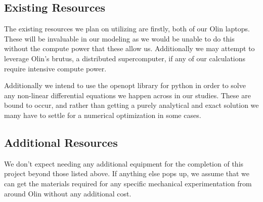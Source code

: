 \subsection{Existing Resources}
The existing resources we plan on utilizing are firstly, both of our Olin laptops. These will be invaluable in our modeling as we would be unable to do this without the compute power that these allow us. Additionally we may attempt to leverage Olin's brutus, a distributed supercomputer, if any of our calculations require intensive compute power.

Additionally we intend to use the openopt library for python in order to solve any non-linear differential equations we happen across in our studies. These are bound to occur, and rather than getting a purely analytical and exact solution we many have to settle for a numerical optimization in some cases.

\subsection{Additional Resources}
We don't expect needing any additional equipment for the completion of this project beyond those listed above. If anything else pops up, we assume that we can get the materials required for any specific mechanical experimentation from around Olin without any additional cost.